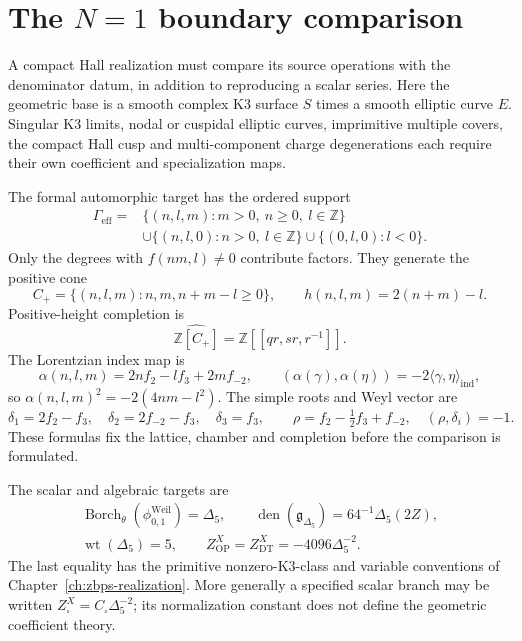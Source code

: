 \section{The \texorpdfstring{\(N=1\)}{N=1} boundary comparison}
\label{sec:n1-boundary-compatibility-conditions}

A compact Hall realization must compare its source operations with
the denominator datum, in addition to reproducing a scalar series.
Here the geometric base is a smooth complex K3 surface \(S\) times a
smooth elliptic curve \(E\). Singular K3 limits, nodal or cuspidal
elliptic curves, imprimitive multiple covers, the compact Hall cusp
and multi-component charge degenerations each require their own
coefficient and specialization maps.

The formal automorphic target has the ordered support
\[
 \begin{split}
 \Gamma_{\mathrm{eff}}={}&
 \{(n,l,m):m>0,\ n\ge0,\ l\in\mathbb Z\}\\
 &\cup\{(n,l,0):n>0,\ l\in\mathbb Z\}
 \cup\{(0,l,0):l<0\}.
 \end{split}
\]
Only the degrees with \(f(nm,l)\ne0\) contribute factors. They
generate the positive cone
\[
 C_+=\{(n,l,m):n,m,n+m-l\ge0\},\qquad
 h(n,l,m)=2(n+m)-l.
\]
Positive-height completion is
\[
 \widehat{\mathbb Z[C_+]}=\mathbb Z[[qr,sr,r^{-1}]].
\]
The Lorentzian index map is
\[
 \alpha(n,l,m)=2nf_2-lf_3+2mf_{-2},
 \qquad
 (\alpha(\gamma),\alpha(\eta))
       =-2\langle\gamma,\eta\rangle_{\mathrm{ind}},
\]
so \(\alpha(n,l,m)^2=-2(4nm-l^2)\).
The simple roots and Weyl vector are
\[
 \delta_1=2f_2-f_3,\quad\delta_2=2f_{-2}-f_3,\quad\delta_3=f_3,
 \qquad
 \rho=f_2-\tfrac12f_3+f_{-2},\quad(\rho,\delta_i)=-1.
\]
These formulas fix the lattice, chamber and completion before the
comparison is formulated.

The scalar and algebraic targets are
\[
 \begin{gathered}
 \operatorname{Borch}_{\theta}(\phi_{0,1}^{\mathrm{Weil}})=\Delta_5,
 \qquad
 \operatorname{den}(\mathfrak g_{\Delta_5})
       =64^{-1}\Delta_5(2Z),\\
 \operatorname{wt}(\Delta_5)=5,
 \qquad Z^X_{\mathrm{OP}}=Z^X_{\mathrm{DT}}
       =-4096\Delta_5^{-2}.
 \end{gathered}
\]
The last equality has the primitive nonzero-K3-class and variable
conventions of Chapter~\ref{ch:zbps-realization}. More generally a
specified scalar branch may be written
\(Z^X_{\square}=C_{\square}\Delta_5^{-2}\); its normalization
constant does not define the geometric coefficient theory.

